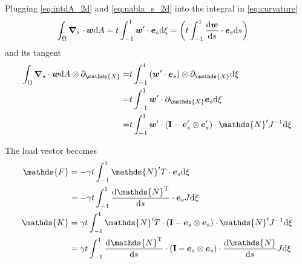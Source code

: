 \documentclass[a4paper,11pt]{article}
\renewcommand{\to}[1]{\text{\boldmath $#1$}} %
\newcommand{\ts}[1]{\text{\boldmath $\mathrm{#1}$}} %
\newcommand{\uv}[1]{\mathds{#1}}
\newcommand{\um}[1]{\mathds{#1}}
\newcommand{\intd}[1]{\mathrm{d}#1}
\newcommand{\pderiv}[2]{\partial_{#2} #1}
\newcommand{\dderiv}[2]{\frac{\mathrm{d}#1}{\mathrm{d}#2}}
\newcommand{\T}{\mathrm{T}}
\DeclareMathOperator{\sign}{sign}
\begin{document}
Plugging \eqref{eq:intdA_2d} and \eqref{eq:nabla_s_2d} into the integral in \eqref{eq:curvature}
\begin{align}
 \int_\Omega\to \nabla_s\cdot\to w\intd A &= t \int_{-1}^{1} \to w'\cdot \to e_s \intd\xi = \left( t \int_{-1}^1 \dderiv{\to w}{s} \cdot \to e_s\intd s\right)
\end{align}
and its tangent
\begin{align}
 \int_\Omega\to \nabla_s\cdot\to w\intd A \otimes \pderiv{}{\uv X}
 =&t \int_{-1}^{1} \left(\to w'\cdot \to e_s\right)\otimes \pderiv{}{\uv X}  \intd\xi\\
 =&t \int_{-1}^{1} \to w'\cdot \pderiv{\to e_s}{\uv X} \intd\xi\\
 =&t \int_{-1}^{1} \to w'\cdot \left(\ts I-\to e_s'\otimes\to e_s' \right)\cdot \um N' J^{-1} \intd\xi
\end{align}


The load vector becomes
\begin{align}
 \uv F &= -\gamma t \int_{-1}^{1} {\um N}'^\T\cdot \to e_s \intd\xi\\
       &= -\gamma t \int_{-1}^{1} \dderiv{{\um N}^\T}{s}\cdot \to e_s J \intd\xi \\
 \um K &= \gamma t \int_{-1}^{1} {\um N}'^\T\cdot \left(\ts I-\to e_s\otimes\to e_s\right)\cdot{\um N}' J^{-1} \intd\xi\\
       &=  \gamma t \int_{-1}^{1} \dderiv{\um N^\T}{s}\cdot \left(\ts I-\to e_s\otimes\to e_s\right)\cdot\dderiv{\um N}{s} J \intd\xi
\end{align}
\end{document}
